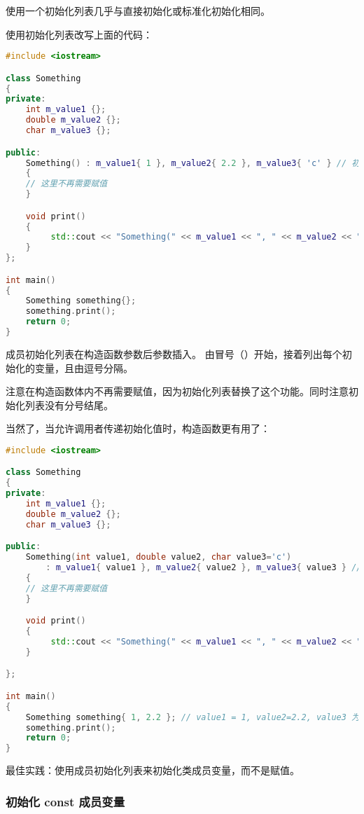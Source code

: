 \documentclass[../../LearnCpp.tex]{subfiles}
\begin{document}
使用一个初始化列表几乎与直接初始化或标准化初始化相同。

使用初始化列表改写上面的代码：

\begin{lstlisting}[language=C++]
#include <iostream>

class Something
{
private:
    int m_value1 {};
    double m_value2 {};
    char m_value3 {};

public:
    Something() : m_value1{ 1 }, m_value2{ 2.2 }, m_value3{ 'c' } // 初始化成员变量
    {
    // 这里不再需要赋值
    }

    void print()
    {
         std::cout << "Something(" << m_value1 << ", " << m_value2 << ", " << m_value3 << ")\n";
    }
};

int main()
{
    Something something{};
    something.print();
    return 0;
}
\end{lstlisting}

成员初始化列表在构造函数参数后参数插入。
由冒号（\acode{:}）开始，接着列出每个初始化的变量，且由逗号分隔。

注意在构造函数体内不再需要赋值，因为初始化列表替换了这个功能。同时注意初始化列表没有分号结尾。

当然了，当允许调用者传递初始化值时，构造函数更有用了：

\begin{lstlisting}[language=C++]
#include <iostream>

class Something
{
private:
    int m_value1 {};
    double m_value2 {};
    char m_value3 {};

public:
    Something(int value1, double value2, char value3='c')
        : m_value1{ value1 }, m_value2{ value2 }, m_value3{ value3 } // 直接初始化成员变量
    {
    // 这里不再需要赋值
    }

    void print()
    {
         std::cout << "Something(" << m_value1 << ", " << m_value2 << ", " << m_value3 << ")\n";
    }

};

int main()
{
    Something something{ 1, 2.2 }; // value1 = 1, value2=2.2, value3 为默认值 'c'
    something.print();
    return 0;
}
\end{lstlisting}

最佳实践：使用成员初始化列表来初始化类成员变量，而不是赋值。

\subsubsection*{初始化 const 成员变量}
\end{document}

